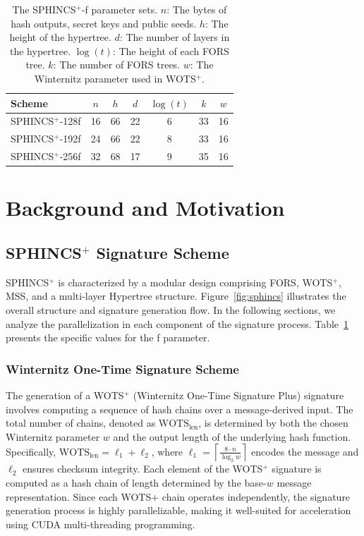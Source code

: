 \documentclass[10pt,conference]{IEEEtran}
\begin{document}
\begin{table}[htbp]
\centering
\captionsetup{font=small} 
\caption{The SPHINCS$^+$-f parameter sets. $n$: The bytes of hash outputs, secret keys and public seeds. $h$: The height of the hypertree. $d$: The number of layers in the hypertree. $\log(t)$: The height of each FORS tree. $k$: The number of FORS trees. $w$: The Winternitz parameter used in WOTS$^+$.}
\vspace{1mm}
\begin{tabular}{@{}lcccccc@{}}
\toprule
\textbf{Scheme} & \textbf{$n$} & \textbf{$h$} & \textbf{$d$} & \textbf{$\log(t)$} & \textbf{$k$} & \textbf{$w$} \\
\midrule
SPHINCS$^+$-128f  & 16 & 66 & 22 & 6  & 33 & 16 \\
SPHINCS$^+$-192f  & 24 & 66 & 22 & 8  & 33 & 16 \\
SPHINCS$^+$-256f  & 32 & 68 & 17 & 9  & 35 & 16 \\
\bottomrule
\end{tabular}
\label{tab:params}
\end{table}

\section{Background and Motivation}
\label{sec:bg}
\subsection{SPHINCS$^+$ Signature Scheme}
SPHINCS$^+$ is characterized by a modular design comprising FORS, WOTS$^+$, MSS, and a multi-layer Hypertree structure. Figure~\ref{fig:sphincs} illustrates the overall structure and signature generation flow. In the following sections, we analyze the parallelization in each component of the signature process. Table~\ref{tab:params} presents the specific values for the f parameter.  


\subsubsection{Winternitz One-Time Signature Scheme}
The generation of a WOTS$^+$ (Winternitz One-Time Signature Plus) signature involves computing a sequence of hash chains over a message-derived input. The total number of chains, denoted as $\text{WOTS}_{\text{len}}$, is determined by both the chosen Winternitz parameter $w$ and the output length of the underlying hash function. Specifically, $\text{WOTS}_{\text{len}} = \ell_1 + \ell_2$, where $\ell_1 = \left\lceil \frac{8\cdot n}{\log_2 w} \right\rceil$ encodes the message and $\ell_2$ ensures checksum integrity. Each element of the WOTS$^+$  signature is computed as a hash chain of length determined by the base-$w$ message representation. Since each WOTS+ chain operates independently, the signature generation process is highly parallelizable, making it well-suited for acceleration using CUDA multi-threading programming.
\end{document}
